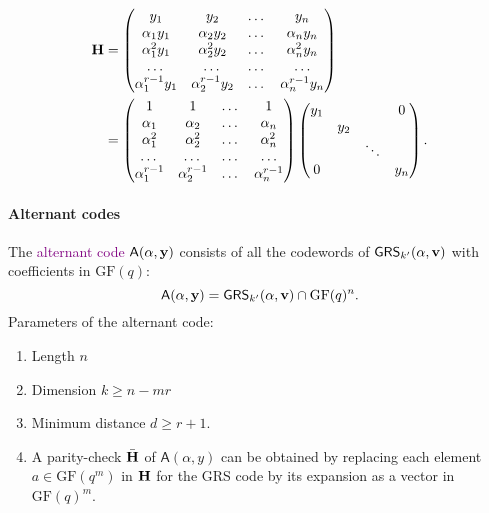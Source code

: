 \documentclass[a4paper, 11pt, openany]{book}
\numberwithin{equation}{section}
\theoremstyle{plain}
\theoremstyle{definition}
\newcommand{\GF}{\mathrm{GF}}
\newcommand{\Define}[1]{\textcolor{purple}{#1}}
\newcommand{\code}[1]{\mathsf{#1}}
\newcommand{\GeneralizedReedSolomon}{\code{GRS}}
\newcommand{\Alternant}             {\code{A}}
\begin{document}
\begin{align*}
	{\bf H} &= \begin{pmatrix}
		y_1 & y_2 & \dots & y_n\\
		\alpha_1 y_1 & \alpha_2 y_2 & \dots & \alpha_n y_n\\
		\alpha_1^2 y_1 & \alpha_2^2 y_2 & \dots & \alpha_n^2 y_n\\
		\dots & \dots & \dots & \dots\\
		\alpha_1^{r-1} y_1 & \alpha_2^{r-1} y_2 & \dots & \alpha_n^{r-1} y_n
	\end{pmatrix}\\
	&= \begin{pmatrix}
			1 & 1 & \dots & 1\\
			\alpha_1 & \alpha_2 & \dots & \alpha_n \\
			\alpha_1^2 & \alpha_2^2 & \dots & \alpha_n^2 \\
			\dots & \dots & \dots & \dots\\
			\alpha_1^{r-1} & \alpha_2^{r-1} & \dots & \alpha_n^{r-1}
		\end{pmatrix}
		\begin{pmatrix}
		y_1 	&  		& 		& 0		\\
		 		& y_2 	& 		&  		\\
				&		& \ddots& 		\\
		0		&		&		&y_n	
		\end{pmatrix}.
\end{align*}



\paragraph{Alternant codes}
The \Define{alternant code} $\Alternant({\bf \alpha}, {\bf y})$ consists of all the codewords of $\GeneralizedReedSolomon_{k'}( {\bf \alpha}, {\bf v} )$ with coefficients in $\GF(q)$:
\[
	\Alternant({\bf \alpha}, {\bf y}) = \GeneralizedReedSolomon_{k'}( {\bf \alpha}, {\bf v} ) \cap \GF(q)^n.
\]
Parameters of the alternant code:
\begin{enumerate}
	\item Length $n$
	
	\item Dimension $k \ge n-mr$
	
	\item Minimum distance $d \ge r+1$.
	
	\item A parity-check $\bar{\bf H}$ of $\Alternant(\alpha, y)$ can be obtained by replacing each element $a \in \GF(q^m)$ in ${\bf H}$ for the GRS code by its expansion as a vector in $\GF(q)^m$.
\end{enumerate}
\end{document}
